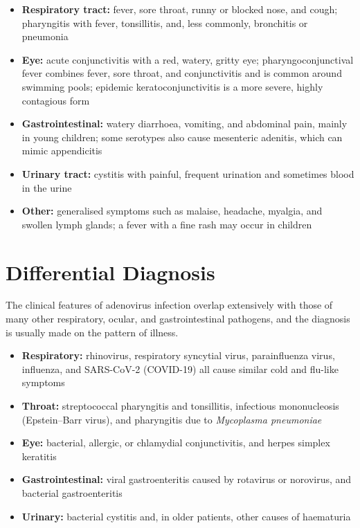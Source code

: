 \begin{itemize}
    \item \textbf{Respiratory tract:} fever, sore throat, runny or blocked nose, and cough; pharyngitis with fever, tonsillitis, and, less commonly, bronchitis or pneumonia
    \item \textbf{Eye:} acute conjunctivitis with a red, watery, gritty eye; pharyngoconjunctival fever combines fever, sore throat, and conjunctivitis and is common around swimming pools; epidemic keratoconjunctivitis is a more severe, highly contagious form
    \item \textbf{Gastrointestinal:} watery diarrhoea, vomiting, and abdominal pain, mainly in young children; some serotypes also cause mesenteric adenitis, which can mimic appendicitis
    \item \textbf{Urinary tract:} cystitis with painful, frequent urination and sometimes blood in the urine
    \item \textbf{Other:} generalised symptoms such as malaise, headache, myalgia, and swollen lymph glands; a fever with a fine rash may occur in children
\end{itemize}

\section*{Differential Diagnosis}
The clinical features of adenovirus infection overlap extensively with those of many other respiratory, ocular, and gastrointestinal pathogens, and the diagnosis is usually made on the pattern of illness.

\begin{itemize}
    \item \textbf{Respiratory:} rhinovirus, respiratory syncytial virus, parainfluenza virus, influenza, and SARS-CoV-2 (COVID-19) all cause similar cold and flu-like symptoms
    \item \textbf{Throat:} streptococcal pharyngitis and tonsillitis, infectious mononucleosis (Epstein--Barr virus), and pharyngitis due to \textit{Mycoplasma pneumoniae}
    \item \textbf{Eye:} bacterial, allergic, or chlamydial conjunctivitis, and herpes simplex keratitis
    \item \textbf{Gastrointestinal:} viral gastroenteritis caused by rotavirus or norovirus, and bacterial gastroenteritis
    \item \textbf{Urinary:} bacterial cystitis and, in older patients, other causes of haematuria
\end{itemize}

